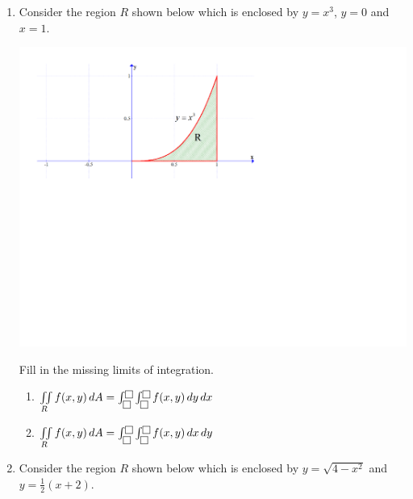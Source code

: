 \documentclass[12pt]{article}
\newif\ifans
\begin{document}
\begin{enumerate}

\item Consider the region $R$ shown below which is enclosed by $y=x^3$, $y=0$ and $x=1$.

\begin{center}
\includegraphics[scale=0.6]{int1.pdf}
\end{center}

Fill in the missing limits of integration.

\begin{enumerate}

\item $\iint \limits_{R} f(x,y) \,dA= \int_{\fbox{}}^{\fbox{}}\int_{\fbox{}}^{\fbox{}} f(x,y) \,dy \,dx$

\ifans{\fbox{$\iint \limits_{R} f(x,y) \,dA=\int_{0}^{1}\int_{0}^{x^3} f(x,y) \,dy \,dx $}} \fi

\item $\iint \limits_{R} f(x,y) \,dA= \int_{\fbox{}}^{\fbox{}}\int_{\fbox{}}^{\fbox{}} f(x,y) \,dx \,dy$

\ifans{\fbox{$\iint \limits_{R} f(x,y) \,dA= \int_{0}^{1}\int_{\sqrt[3]{y}}^{1} f(x,y) \,dx \,dy$}} \fi

\end{enumerate}

\item Consider the region $R$ shown below which is enclosed by $y=\sqrt{4-x^2}$ and $y=\frac{1}{2}(x+2)$.


\end{enumerate}
\end{document}
